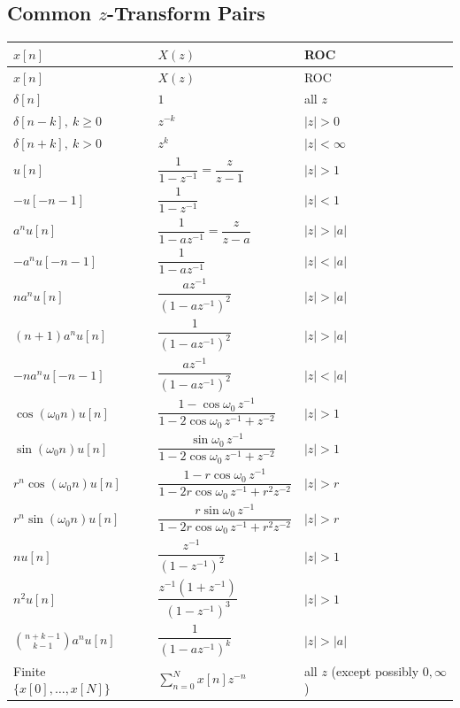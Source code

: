 \documentclass[10pt]{article}
\begin{document}
\subsection{Common $z$-Transform Pairs}
\begin{longtable}{@{}lll@{}}
\toprule $x[n]$ & $X(z)$ & ROC \\ \midrule \endfirsthead
\toprule $x[n]$ & $X(z)$ & ROC \\ \midrule \endhead
\bottomrule \endfoot
$\delta[n]$ & $1$ & all $z$ \\
$\delta[n - k],\ k\ge 0$ & $z^{-k}$ & $|z| > 0$ \\
$\delta[n + k],\ k > 0$ & $z^{k}$ & $|z| < \infty$ \\
$u[n]$ & $\dfrac{1}{1 - z^{-1}} = \dfrac{z}{z - 1}$ & $|z| > 1$ \\
$-u[-n-1]$ & $\dfrac{1}{1 - z^{-1}}$ & $|z| < 1$ \\
$a^n u[n]$ & $\dfrac{1}{1 - az^{-1}} = \dfrac{z}{z - a}$ & $|z| > |a|$ \\
$-a^n u[-n-1]$ & $\dfrac{1}{1 - az^{-1}}$ & $|z| < |a|$ \\
$n a^n u[n]$ & $\dfrac{az^{-1}}{(1 - az^{-1})^2}$ & $|z| > |a|$ \\
$(n+1)a^n u[n]$ & $\dfrac{1}{(1 - az^{-1})^2}$ & $|z| > |a|$ \\
$-n a^n u[-n-1]$ & $\dfrac{az^{-1}}{(1 - az^{-1})^2}$ & $|z| < |a|$ \\
$\cos(\omega_0 n)u[n]$ & $\dfrac{1 - \cos\omega_0\,z^{-1}}{1 - 2\cos\omega_0\,z^{-1} + z^{-2}}$ & $|z| > 1$ \\
$\sin(\omega_0 n)u[n]$ & $\dfrac{\sin\omega_0\,z^{-1}}{1 - 2\cos\omega_0\,z^{-1} + z^{-2}}$ & $|z| > 1$ \\
$r^n\cos(\omega_0 n)u[n]$ & $\dfrac{1 - r\cos\omega_0\,z^{-1}}{1 - 2r\cos\omega_0\,z^{-1} + r^2 z^{-2}}$ & $|z| > r$ \\
$r^n\sin(\omega_0 n)u[n]$ & $\dfrac{r\sin\omega_0\,z^{-1}}{1 - 2r\cos\omega_0\,z^{-1} + r^2 z^{-2}}$ & $|z| > r$ \\
$n u[n]$ & $\dfrac{z^{-1}}{(1 - z^{-1})^2}$ & $|z| > 1$ \\
$n^2 u[n]$ & $\dfrac{z^{-1}(1 + z^{-1})}{(1 - z^{-1})^3}$ & $|z| > 1$ \\
$\binom{n+k-1}{k-1}a^n u[n]$ & $\dfrac{1}{(1 - az^{-1})^k}$ & $|z| > |a|$ \\
Finite $\{x[0],\dots,x[N]\}$ & $\sum_{n=0}^N x[n]z^{-n}$ & all $z$ (except possibly $0,\infty$) \\
\end{longtable}
\end{document}
